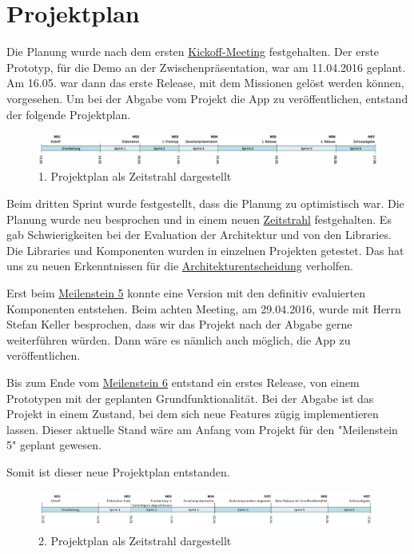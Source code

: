 


\section{Projektplan}

Die Planung wurde nach dem ersten \hyperref[pm-ms1]{Kickoff-Meeting} festgehalten. 
Der erste Prototyp, für die Demo an der Zwischenpräsentation, war am 11.04.2016 geplant. 
Am 16.05. war dann das erste Release, mit dem Missionen gelöst werden können, vorgesehen. 
Um bei der Abgabe vom Projekt die App zu veröffentlichen, entstand der folgende Projektplan.

\begin{figure}[H]
	\centering
	\includegraphics[width=\textwidth]{images/projektmanagement/zeitstrahl_v1.png}
	\caption{1. Projektplan als Zeitstrahl dargestellt}
	\label{image-project-plan-timeline1}
\end{figure}

Beim dritten Sprint wurde festgestellt, dass die Planung zu optimistisch war. 
Die Planung wurde neu besprochen und in einem neuen \hyperref[image-project-plan-timeline2]{Zeitstrahl} festgehalten. 
Es gab Schwierigkeiten bei der Evaluation der Architektur und von den Libraries. 
Die Libraries und Komponenten wurden in einzelnen Projekten getestet. 
Das hat uns zu neuen Erkenntnissen für die \hyperref[tb-evaluation-architektur]{Architekturentscheidung} verholfen. 

Erst beim \hyperref[pm-ms5]{Meilenstein 5} konnte eine Version mit den definitiv evaluierten Komponenten entstehen. 
Beim achten Meeting, am 29.04.2016, wurde mit Herrn Stefan Keller besprochen, dass wir das Projekt nach der Abgabe gerne weiterführen würden.
Dann wäre es nämlich auch möglich, die App zu veröffentlichen.

Bis zum Ende vom \hyperref[pm-ms6]{Meilenstein 6} entstand ein erstes Release, von einem Prototypen mit der geplanten Grundfunktionalität. 
Bei der Abgabe ist das Projekt in einem Zustand, bei dem sich neue Features zügig implementieren lassen.
Dieser aktuelle Stand wäre am Anfang vom Projekt für den "Meilenstein 5" geplant gewesen.

Somit ist dieser neue Projektplan entstanden.

\begin{figure}[H]
	\centering
	\includegraphics[width=\textwidth]{images/projektmanagement/zeitstrahl_v2.png}
	\caption{2. Projektplan als Zeitstrahl dargestellt}
	\label{image-project-plan-timeline2}
\end{figure}




